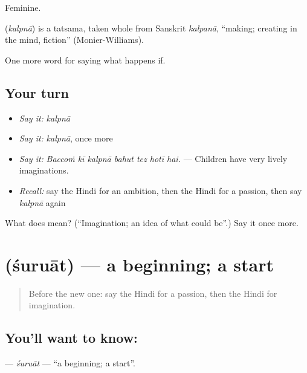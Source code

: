 Feminine.

\begin{cousinweb}
\textbf{} (\emph{kalpnā}) is a tatsama, taken whole from Sanskrit \emph{kalpanā}, \textquotedblleft{}making; creating in the mind, fiction\textquotedblright{} (Monier-Williams).
\end{cousinweb}

\begin{grammarlens}[title={What you've built}]
One more word for saying what happens if.
\end{grammarlens}

\subsection*{Your turn}
\begin{itemize}
\raggedright
  \item \emph{Say it:} \emph{kalpnā}
  \item \emph{Say it:} \emph{kalpnā}, once more
  \item \emph{Say it:} \emph{Baccoṁ kī kalpnā bahut tez hotī hai.} — Children have very lively imaginations.
  \item \emph{Recall:} say the Hindi for an ambition, then the Hindi for a passion, then say \emph{kalpnā} again
\end{itemize}

\begin{tcolorbox}[breakable,colback=teal!4,colframe=teal!35!black,title={Before you move on}]
What does  mean? (\textquotedblleft{}Imagination; an idea of what could be\textquotedblright{}.) Say it once more.
\end{tcolorbox}
\section[\texorpdfstring{\hi{शुरुआत} (śuruāt)}{शुरुआत (śuruāt)}]{ (śuruāt) — a beginning; a start}

\label{lesson:HI-C559-suruat}



\begin{quote}
Before the new one: say the Hindi for a passion, then the Hindi for imagination.
\end{quote}

\subsection*{You'll want to know: }
\textbf{} — \emph{śuruāt} — \textquotedblleft{}a beginning; a start\textquotedblright{}.


